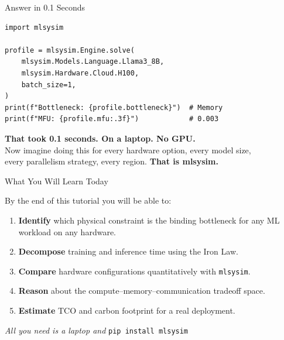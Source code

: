 \documentclass[aspectratio=169, 12pt]{beamer}
\newcommand{\mlsysim}{\texttt{mlsysim}}
\begin{document}
\begin{frame}[fragile,shrink=10]{Answer in 0.1 Seconds}

\begin{lstlisting}
import mlsysim

profile = mlsysim.Engine.solve(
    mlsysim.Models.Language.Llama3_8B,
    mlsysim.Hardware.Cloud.H100,
    batch_size=1,
)
print(f"Bottleneck: {profile.bottleneck}")  # Memory
print(f"MFU: {profile.mfu:.3f}")            # 0.003
\end{lstlisting}

\vfill
\centering
\textbf{That took 0.1 seconds. On a laptop. No GPU.}\\[0.2cm]
\small Now imagine doing this for every hardware option, every model size,\\
every parallelism strategy, every region. \textbf{That is mlsysim.}
\end{frame}

\begin{frame}[shrink]{What You Will Learn Today}

\small
By the end of this tutorial you will be able to:
\begin{enumerate}
  \item \textbf{Identify} which physical constraint is the binding bottleneck
        for any ML workload on any hardware.
  \item \textbf{Decompose} training and inference time using the Iron Law.
  \item \textbf{Compare} hardware configurations quantitatively with \mlsysim.
  \item \textbf{Reason} about the compute--memory--communication tradeoff space.
  \item \textbf{Estimate} TCO and carbon footprint for a real deployment.
\end{enumerate}

\vspace{0.3cm}
\centering
\textit{All you need is a laptop and} \texttt{pip install mlsysim}
\end{frame}
\end{document}
